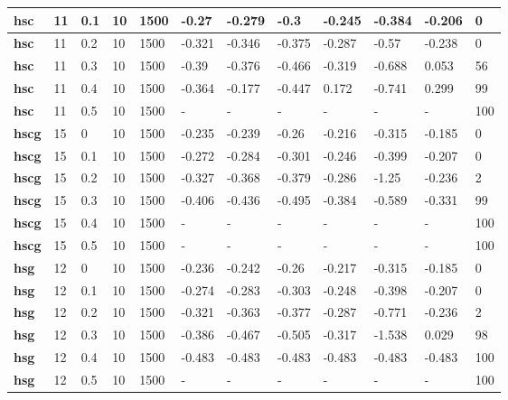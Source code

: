 \begin{longtable}[h]{|p{0.8cm}|p{1.5cm}|p{1cm}|p{1cm}|p{1cm}|p{1cm}|p{1cm}|p{1cm}|p{1cm}|p{1cm}|p{1cm}|p{1.5cm}|}
    \\ \hline
  \textbf{hsc } &  11         & 0.1 & 10 & 1500 &  -0.27 & -0.279 &   -0.3 & -0.245 & -0.384 & -0.206 &   0
    \\ \hline
  \textbf{hsc } &  11         & 0.2 & 10 & 1500 & -0.321 & -0.346 & -0.375 & -0.287 &  -0.57 & -0.238 &   0
    \\ \hline
  \textbf{hsc } &  11         & 0.3 & 10 & 1500 &  -0.39 & -0.376 & -0.466 & -0.319 & -0.688 &  0.053 &  56
    \\ \hline
  \textbf{hsc } &  11         & 0.4 & 10 & 1500 & -0.364 & -0.177 & -0.447 &  0.172 & -0.741 &  0.299 &  99
    \\ \hline
  \textbf{hsc } &  11         & 0.5 & 10 & 1500 & - & - & - & - & - & - & 100
    \\ \hline
  \textbf{hscg} &  15         &   0 & 10 & 1500 & -0.235 & -0.239 &  -0.26 & -0.216 & -0.315 & -0.185 &   0
    \\ \hline
  \textbf{hscg} &  15         & 0.1 & 10 & 1500 & -0.272 & -0.284 & -0.301 & -0.246 & -0.399 & -0.207 &   0
    \\ \hline
  \textbf{hscg} &  15         & 0.2 & 10 & 1500 & -0.327 & -0.368 & -0.379 & -0.286 &  -1.25 & -0.236 &   2
    \\ \hline
  \textbf{hscg} &  15         & 0.3 & 10 & 1500 & -0.406 & -0.436 & -0.495 & -0.384 & -0.589 & -0.331 &  99
    \\ \hline
  \textbf{hscg} &  15         & 0.4 & 10 & 1500 & - & - & - & - & - & - & 100
    \\ \hline
  \textbf{hscg} &  15         & 0.5 & 10 & 1500 & - & - & - & - & - & - & 100
    \\ \hline
  \textbf{hsg } &  12         &   0 & 10 & 1500 & -0.236 & -0.242 &  -0.26 & -0.217 & -0.315 & -0.185 &   0
    \\ \hline
  \textbf{hsg } &  12         & 0.1 & 10 & 1500 & -0.274 & -0.283 & -0.303 & -0.248 & -0.398 & -0.207 &   0
    \\ \hline
  \textbf{hsg } &  12         & 0.2 & 10 & 1500 & -0.321 & -0.363 & -0.377 & -0.287 & -0.771 & -0.236 &   2
    \\ \hline
  \textbf{hsg } &  12         & 0.3 & 10 & 1500 & -0.386 & -0.467 & -0.505 & -0.317 & -1.538 &  0.029 &  98
    \\ \hline
  \textbf{hsg } &  12         & 0.4 & 10 & 1500 & -0.483 & -0.483 & -0.483 & -0.483 & -0.483 & -0.483 & 100
    \\ \hline
  \textbf{hsg } &  12         & 0.5 & 10 & 1500 & - & - & - & - & - & - & 100
    \\ \hline
 \end{longtable}
